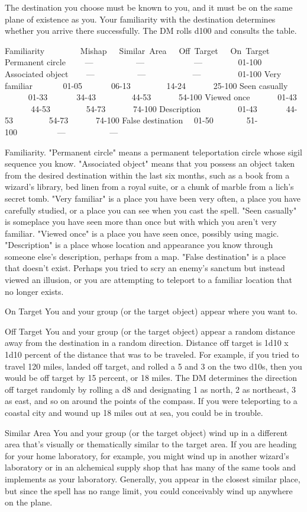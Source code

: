 \documentclass[10pt,twocolumn]{report}
\begin{document}
The destination you choose must be known to you, and it must be on the same plane of existence as you. Your familiarity with the destination determines whether you arrive there successfully. The DM rolls d100 and consults the table.

Familiarity     Mishap  Similar Area  Off Target  On Target
Permanent circle   —       —         —     01-100
Associated object    —       —       —       01-100
Very familiar     01-05      06-13     14-24    25-100
Seen casually     01-33      34-43     44-53    54-100
Viewed once    01-43      44-53     54-73    74-100
Description       01-43      44-53     54-73    74-100
False destination  01-50       51-100      —      —

Familiarity.
"Permanent circle" means a permanent teleportation circle whose sigil sequence you know. "Associated object" means that you possess an object taken from the desired destination within the last six months, such as a book from a wizard's library, bed linen from a royal suite, or a chunk of marble from a lich's secret tomb.
"Very familiar" is a place you have been very often, a place you have carefully studied, or a place you can see when you cast the spell. "Seen casually" is someplace you have seen more than once but with which you aren't very familiar. "Viewed once" is a place you have seen once, possibly using magic. "Description" is a place whose location and appearance you know through someone else's description, perhaps from a map.
"False destination" is a place that doesn't exist. Perhaps you tried to scry an enemy's sanctum but instead viewed an illusion, or you are attempting to teleport to a familiar location that no longer exists.

On Target
You and your group (or the target object) appear where you want to.

Off Target
You and your group (or the target object) appear a random distance away from the destination in a random direction. Distance off target is 1d10 x 1d10 percent of the distance that was to be traveled. For example, if you tried to travel 120 miles, landed off target, and rolled a 5 and 3 on the two d10s, then you would be off target by 15 percent, or 18 miles. The DM determines the direction off target randomly by rolling a d8 and designating 1 as north, 2 as northeast, 3 as east, and so on around the points of the compass. If you were teleporting to a coastal city and wound up 18 miles out at sea, you could be in trouble.

Similar Area
You and your group (or the target object) wind up in a different area that's visually or thematically similar to the target area. If you are heading for your home laboratory, for example, you might wind up in another wizard's laboratory or in an alchemical supply shop that has many of the same tools and implements as your laboratory. Generally, you appear in the closest similar place, but since the spell has no range limit, you could conceivably wind up anywhere on the plane.
\end{document}
